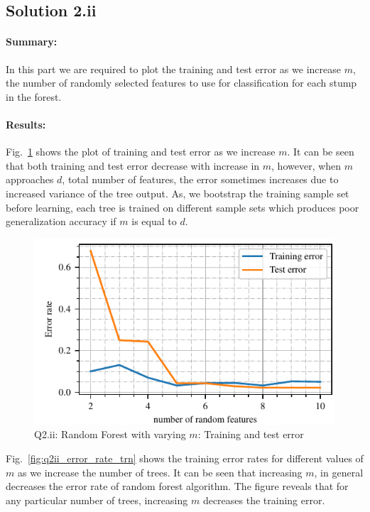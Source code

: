 \subsection*{Solution 2.ii}
\paragraph{Summary:} In this part we are required to plot the training and test error as we increase $m$, the number of randomly selected features to use for classification for each stump in the forest. 
\paragraph{Results:} Fig.~\ref{fig:q2ii_error_rate} shows the plot of training and test error as we increase $m$. It can be seen that both training and test error decrease with increase in $m$, however, when $m$ approaches $d$, total number of features, the error sometimes increases due to increased variance of the tree output. As, we bootstrap the training sample set before learning, each tree is trained on different sample sets which produces poor generalization accuracy if $m$ is equal to $d$. 
\begin{figure}[!h]
	\centering
	\includegraphics[scale=1.0,trim={0cm 0cm 0cm 0cm},clip]{./code/generatedPlots/q2ii_error_rate.pdf}
	\caption{Q2.ii: Random Forest with varying $m$: Training and test error}
	\label{fig:q2ii_error_rate}
\end{figure}
Fig.~\ref{fig:q2ii_error_rate_trn} shows the training error rates for different values of $m$ as we increase the number of trees. It can be seen that increasing $m$, in general decreases the error rate of random forest algorithm. The figure reveals that for any particular number of trees, increasing $m$ decreases the training error. 
